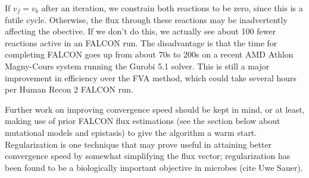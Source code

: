 If $v_f = v_b$ after an iteration, we constrain both reactions to be zero, since this
is a futile cycle. Otherwise, the flux through these reactions may be inadvertently affecting
the obective. If we don't do this, we actually see about 100 fewer reactions active in an FALCON run.
The disadvantage is that the time for completing FALCON goes up from about 70s to 200s on a recent
AMD Athlon Magny-Cours system running the Gurobi 5.1 solver. This is still a major improvement 
in efficiency over the FVA method, which could take several hours per Human Recon 2 FALCON run.

Further work on improving convergence speed should be kept in mind, or
at least, making use of prior FALCON flux estimations (see the section
below about mutational models and epistasis) to give the algorithm a
warm start.  Regularization is one technique that may prove useful in
attaining better convergence speed by somewhat simplifying the flux
vector; regularization has been found to be a biologically important
objective in microbes (cite Uwe Sauer).







